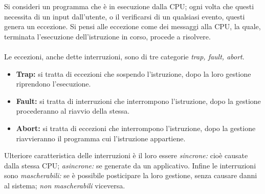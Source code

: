 Si consideri un programma che è in esecuzione dalla CPU; ogni volta che questi necessita di un input dall'utente, o il verificarsi di un qualsiasi evento, questi genera un eccezione.
Si pensi alle eccezione come dei messaggi alla CPU, la quale, terminata l'esecuzione dell'istruzione in corso, procede a risolvere.
\\ \\
Le eccezioni, anche dette interruzioni, sono di tre categorie \emph{trap, fault, abort}.
\begin{itemize}
    \item \textbf{Trap:} si tratta di eccezioni che sospendo l'istruzione, dopo la loro gestione riprendono l'esecuzione.
    \item \textbf{Fault:} si tratta di interruzioni che interrompono l'istruzione, dopo la gestione procederanno al riavvio della stessa.
    \item \textbf{Abort:} si tratta di eccezioni che interrompono l'istruzione, dopo la gestione riavvieranno il programma cui l'istruzione appartiene.
\end{itemize}

\noindent Ulteriore caratteristica delle interruzioni è il loro essere \emph{sincrone:} cioè causate dalla stessa CPU; \emph{asincrone:} se generate da un applicativo.
Infine le interruzioni sono \emph{mascherabili:} se è possibile posticipare la loro gestione, senza causare danni al sistema; \emph{non mascherabili} viceversa.